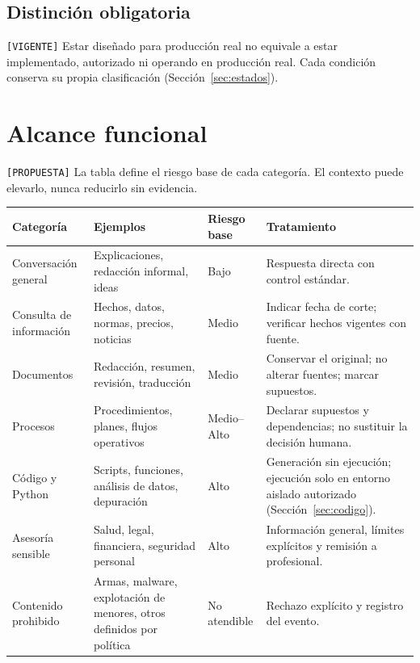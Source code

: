 \documentclass[12pt]{article}
\begin{document}
\subsection{Distinción obligatoria}

\texttt{[VIGENTE]} Estar diseñado para producción real no equivale a estar
implementado, autorizado ni operando en producción real. Cada condición
conserva su propia clasificación (Sección~\ref{sec:estados}).

\section{Alcance funcional}
\label{sec:alcance}

\texttt{[PROPUESTA]} La tabla define el riesgo base de cada categoría. El
contexto puede elevarlo, nunca reducirlo sin evidencia.

\begin{longtable}{|p{3.1cm}|p{4.6cm}|p{2.1cm}|p{4.2cm}|}
\hline
\textbf{Categoría} & \textbf{Ejemplos} & \textbf{Riesgo base} & \textbf{Tratamiento} \\
\hline
\endhead
Conversación general & Explicaciones, redacción informal, ideas & Bajo & Respuesta directa con control estándar. \\
\hline
Consulta de información & Hechos, datos, normas, precios, noticias & Medio & Indicar fecha de corte; verificar hechos vigentes con fuente. \\
\hline
Documentos & Redacción, resumen, revisión, traducción & Medio & Conservar el original; no alterar fuentes; marcar supuestos. \\
\hline
Procesos & Procedimientos, planes, flujos operativos & Medio--Alto & Declarar supuestos y dependencias; no sustituir la decisión humana. \\
\hline
Código y Python & Scripts, funciones, análisis de datos, depuración & Alto & Generación sin ejecución; ejecución solo en entorno aislado autorizado (Sección~\ref{sec:codigo}). \\
\hline
Asesoría sensible & Salud, legal, financiera, seguridad personal & Alto & Información general, límites explícitos y remisión a profesional. \\
\hline
Contenido prohibido & Armas, malware, explotación de menores, otros definidos por política & No atendible & Rechazo explícito y registro del evento. \\
\hline
\end{longtable}
\end{document}
